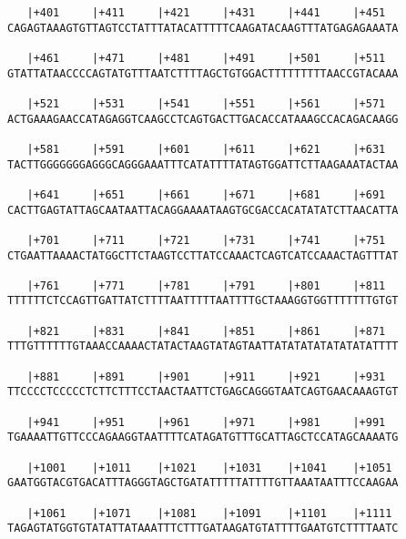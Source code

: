 \documentclass{article}
\begin{document}
\begin{Verbatim}
   |+401     |+411     |+421     |+431     |+441     |+451  
CAGAGTAAAGTGTTAGTCCTATTTATACATTTTTCAAGATACAAGTTTATGAGAGAAATA
                                                            
   |+461     |+471     |+481     |+491     |+501     |+511  
GTATTATAACCCCAGTATGTTTAATCTTTTAGCTGTGGACTTTTTTTTTAACCGTACAAA
                                                            
   |+521     |+531     |+541     |+551     |+561     |+571  
ACTGAAAGAACCATAGAGGTCAAGCCTCAGTGACTTGACACCATAAAGCCACAGACAAGG
                                                            
   |+581     |+591     |+601     |+611     |+621     |+631  
TACTTGGGGGGGAGGGCAGGGAAATTTCATATTTTATAGTGGATTCTTAAGAAATACTAA
                                                            
   |+641     |+651     |+661     |+671     |+681     |+691  
CACTTGAGTATTAGCAATAATTACAGGAAAATAAGTGCGACCACATATATCTTAACATTA
                                                            
   |+701     |+711     |+721     |+731     |+741     |+751  
CTGAATTAAAACTATGGCTTCTAAGTCCTTATCCAAACTCAGTCATCCAAACTAGTTTAT
                                                            
   |+761     |+771     |+781     |+791     |+801     |+811  
TTTTTTCTCCAGTTGATTATCTTTTAATTTTTAATTTTGCTAAAGGTGGTTTTTTTGTGT
                                                            
   |+821     |+831     |+841     |+851     |+861     |+871  
TTTGTTTTTTGTAAACCAAAACTATACTAAGTATAGTAATTATATATATATATATATTTT
                                                            
   |+881     |+891     |+901     |+911     |+921     |+931  
TTCCCCTCCCCCTCTTCTTTCCTAACTAATTCTGAGCAGGGTAATCAGTGAACAAAGTGT
                                                            
   |+941     |+951     |+961     |+971     |+981     |+991  
TGAAAATTGTTCCCAGAAGGTAATTTTCATAGATGTTTGCATTAGCTCCATAGCAAAATG
                                                            
   |+1001    |+1011    |+1021    |+1031    |+1041    |+1051 
GAATGGTACGTGACATTTAGGGTAGCTGATATTTTTATTTTGTTAAATAATTTCCAAGAA
                                                            
   |+1061    |+1071    |+1081    |+1091    |+1101    |+1111 
TAGAGTATGGTGTATATTATAAATTTCTTTGATAAGATGTATTTTGAATGTCTTTTAATC
                                                            

\end{Verbatim}
\end{document}
